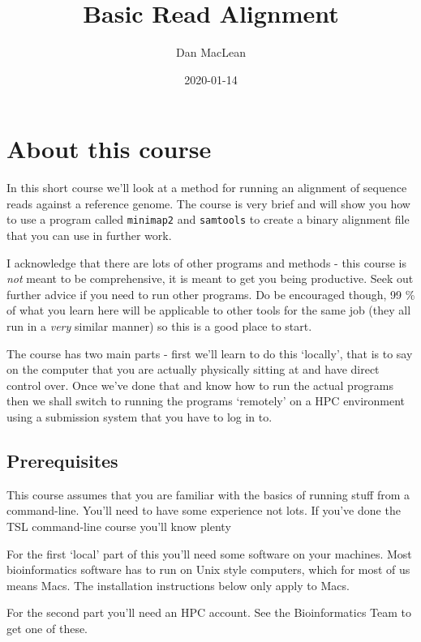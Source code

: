 \documentclass[]{book}
\title{Basic Read Alignment}
\author{Dan MacLean}
\date{2020-01-14}
\begin{document}
\maketitle

{
\setcounter{tocdepth}{1}
\tableofcontents
}
\hypertarget{about-this-course}{%
\chapter{About this course}\label{about-this-course}}

In this short course we'll look at a method for running an alignment of sequence reads against a reference genome. The course is very brief and will show you how to use a program called \texttt{minimap2} and \texttt{samtools} to create a binary alignment file that you can use in further work.

I acknowledge that there are lots of other programs and methods - this course is \emph{not} meant to be comprehensive, it is meant to get you being productive. Seek out further advice if you need to run other programs. Do be encouraged though, 99 \% of what you learn here will be applicable to other tools for the same job (they all run in a \emph{very} similar manner) so this is a good place to start.

The course has two main parts - first we'll learn to do this `locally', that is to say on the computer that you are actually physically sitting at and have direct control over. Once we've done that and know how to run the actual programs then we shall switch to running the programs `remotely' on a HPC environment using a submission system that you have to log in to.

\hypertarget{prerequisites}{%
\section{Prerequisites}\label{prerequisites}}

This course assumes that you are familiar with the basics of running stuff from a command-line. You'll need to have some experience not lots. If you've done the TSL command-line course you'll know plenty

For the first `local' part of this you'll need some software on your machines. Most bioinformatics software has to run on Unix style computers, which for most of us means Macs. The installation instructions below only apply to Macs.

For the second part you'll need an HPC account. See the Bioinformatics Team to get one of these.
\end{document}
